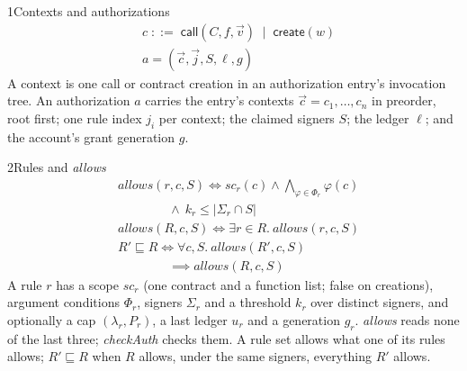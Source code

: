 \begin{perchdefinition}{1}{Contexts and authorizations}\label{def:contexts-and-authorizations}
\[\begin{aligned}&c \;::=\; \mathsf{call}(C, f, \vec v) \;\mid\; \mathsf{create}(w)\\
&a = (\vec c, \vec j, S, \ell, g)\end{aligned}\]
A context is one call or contract creation in an authorization entry's invocation tree. An authorization \(a\) carries the entry's contexts \(\vec c = c_1, \dots, c_n\) in preorder, root first; one rule index \(j_i\) per context; the claimed signers \(S\); the ledger \(\ell\); and the account's grant generation \(g\).
\end{perchdefinition}
\begin{perchdefinition}{2}{Rules and \emph{allows}}\label{def:rules-and-allows}
\[\begin{aligned}&\mathit{allows}(r, c, S) \iff \mathit{sc}_r(c) \land \bigwedge_{\varphi \in \Phi_r} \varphi(c)\\
&\qquad\qquad \land\ k_r \le |\Sigma_r \cap S|\\
&\mathit{allows}(R, c, S) \iff \exists r \in R.\ \mathit{allows}(r, c, S)\\
&R' \sqsubseteq R \iff \forall c, S.\ \mathit{allows}(R', c, S)\\
&\qquad\qquad \implies \mathit{allows}(R, c, S)\end{aligned}\]
A rule \(r\) has a scope \(\mathit{sc}_r\) (one contract and a function list; false on creations), argument conditions \(\Phi_r\), signers \(\Sigma_r\) and a threshold \(k_r\) over distinct signers, and optionally a cap \((\lambda_r, P_r)\), a last ledger \(u_r\) and a generation \(g_r\). \emph{allows} reads none of the last three; \emph{checkAuth} checks them. A rule set allows what one of its rules allows; \(R' \sqsubseteq R\) when \(R\) allows, under the same signers, everything \(R'\) allows.
\end{perchdefinition}
